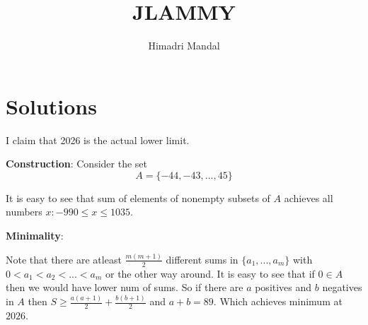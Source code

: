 \documentclass[11pt]{scrartcl}
\title{JLAMMY}
\author{Himadri Mandal}
\begin{document}
\maketitle

\section{Solutions}
\begin{soln}
\raggedright
  I claim that 2026 is the actual lower limit.

  \textbf{Construction}:
  Consider the set $$A = \{-44,-43,...,45\}$$

  It is easy to see that sum of elements of nonempty subsets of $A$ achieves all numbers $x : -990 \leq x \leq 1035$.

  \textbf{Minimality}:

  Note that there are atleast $\frac{m(m+1)}{2}$ different sums in $\{a_1,...,a_m\}$ with $0 < a_1 < a_2 < ... < a_m$ or the other way around. It is easy to see that if $0 \in A$ then we would have lower num of sums. So if there are $a$ positives and $b$ negatives in $A$ then $S \geq \frac{a(a+1)}{2} + \frac{b(b+1)}{2}$ and $a+b = 89$. Which achieves minimum at $2026$.
\end{soln}
\end{document}
